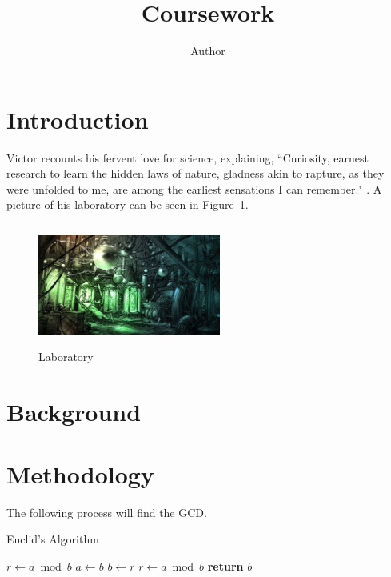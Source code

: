 \documentclass[coverpage]{inftechrep}
\begin{document}
\title{Coursework}
\author{Author}
\maketitle

\section{Introduction}
\label{sec:intro}

Victor recounts his fervent love for science, explaining, ``Curiosity, earnest research to learn the hidden laws of nature, gladness akin to rapture, as they were unfolded to me, are among the earliest sensations I can remember." \citep{shelley1994frankenstein}. A picture of his laboratory can be seen in Figure~\ref{fig:lab}.

\begin{figure}[h]
	\centering
	\includegraphics[width=6cm, height=4cm]{lab.jpg}
	\caption{Laboratory}
	\label{fig:lab}
\end{figure}

\section{Background}
\label{sec:back}

\section{Methodology}
\label{sec:method}

The following process will find the \ac{GCD}.

\begin{algorithm}
\caption{Euclid's Algorithm}\label{alg:euclid}
\begin{algorithmic}[1]
\State $r\gets a\bmod b$
\State $a\gets b$
\State $b\gets r$
\State $r\gets a\bmod b$
\EndWhile
\State \textbf{return} $b$
\EndProcedure
\end{algorithmic}
\end{algorithm}
\end{document}
